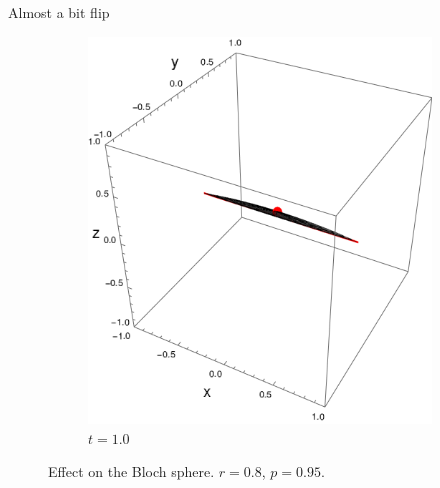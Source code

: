 \begin{frame}{Almost a bit flip}
\begin{figure}[h!]
\begin{subfigure}{0.32\textwidth}
            \includegraphics[width=0.9\linewidth]{figures/sphere_CNOT_t=1.0_z=0.8_p=0.05.png}
            \caption{$t=1.0$}
        \end{subfigure}
        \caption{Effect on the Bloch sphere. $r=0.8$, $p=0.95$.}
    \end{figure}
\end{frame}

